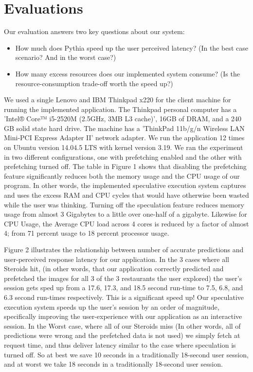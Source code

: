 \section{Evaluations}
\label{sec:eval}
Our evaluation answers two key questions about our system:
\begin{itemize}
\item How much does Pythia speed up the user perceived latency? (In the best case scenario? And in the worst case?)
\item How many excess resources does our implemented system consume? (Is the resource-consumption trade-off worth the speed up?)
\end{itemize}

We used a single Lenovo and IBM Thinkpad x220 for the client machine for running the implemented application. The Thinkpad personal computer has a 'Intel® Core™ i5-2520M (2.5GHz, 3MB L3 cache)', 16GB of DRAM, and a 240 GB solid state hard drive. The machine has a 'ThinkPad 11b/g/n Wireless LAN Mini-PCI Express Adapter II' network adapter. We run the application 12 times on Ubuntu version 14.04.5 LTS with kernel version 3.19. We ran the experiment in two different configurations, one with prefetching enabled and the other with prefetching turned off. The table in Figure 1 shows that disabling the prefetching feature significantly reduces both the memory usage and the CPU usage of our program. In other words, the implemented speculative execution system captures and uses the excess RAM and CPU cycles that would have otherwise been wasted while the user was thinking. Turning off the speculation feature reduces memory usage from almost 3 Gigabytes to a little over one-half of a gigabyte. Likewise for CPU Usage, the Average CPU load across 4 cores is reduced by a factor of almost 4; from 71 percent usage to 18 percent processor usage.

Figure 2 illustrates the relationship between number of accurate predictions and user-perceived response latency for our application. In the 3 cases where all Steroids hit, (in other words, that our application correctly predicted and prefetched the images for all 3 of the 3 restaurants the user explored) the user's session gets sped up from a 17.6, 17.3, and 18.5 second run-time to 7.5, 6.8, and 6.3 second run-times respectively. This is a significant speed up! Our speculative execution system speeds up the user's session by an order of magnitude, specifically improving the user-experience with our application as an interactive session. In the Worst case, where all of our Steroids miss (In other words, all of predictions were wrong and the prefetched data is not used) we simply fetch at request time, and thus deliver latency similar to the case where speculation is turned off. So at best we save 10 seconds in a traditionally 18-second user session, and at worst we take 18 seconds in a traditionally 18-second user session. 
